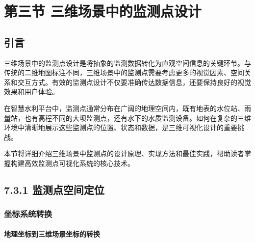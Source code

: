 \section{第三节
三维场景中的监测点设计}\label{ux7b2cux4e09ux8282-ux4e09ux7ef4ux573aux666fux4e2dux7684ux76d1ux6d4bux70b9ux8bbeux8ba1}

\subsection{引言}\label{ux5f15ux8a00}

三维场景中的监测点设计是将抽象的监测数据转化为直观空间信息的关键环节。与传统的二维地图标注不同，三维场景中的监测点需要考虑更多的视觉因素、空间关系和交互方式。有效的监测点设计不仅要准确传达数据信息，还要保持良好的视觉效果和用户体验。

在智慧水利平台中，监测点通常分布在广阔的地理空间内，既有地表的水位站、雨量站，也有高程不同的大坝监测点，还有水下的水质监测设备。如何在复杂的三维环境中清晰地展示这些监测点的位置、状态和数据，是三维可视化设计的重要挑战。

本节将详细介绍三维场景中监测点的设计原理、实现方法和最佳实践，帮助读者掌握构建高效监测点可视化系统的核心技术。

\subsection{7.3.1
监测点空间定位}\label{ux76d1ux6d4bux70b9ux7a7aux95f4ux5b9aux4f4d}

\subsubsection{坐标系统转换}\label{ux5750ux6807ux7cfbux7edfux8f6cux6362}

\paragraph{地理坐标到三维场景坐标的转换}\label{ux5730ux7406ux5750ux6807ux5230ux4e09ux7ef4ux573aux666fux5750ux6807ux7684ux8f6cux6362}

